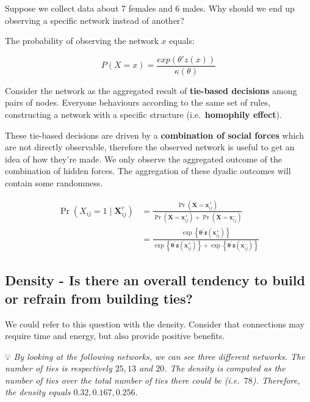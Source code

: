 \documentclass[
  notitlepage,
  onecolumn,
  openany]{book}
\begin{document}
Suppose we collect data about 7 females and 6 males. Why should we end up observing a specific network instead of another?

The probability of observing the network \(x\) equals:

\[
P(X=x) = \frac{exp(\theta'z(x))}{\kappa(\theta)}
\]

Consider the network as the aggregated result of \textbf{tie-based decisions} among pairs of nodes. Everyone behaviours according to the same set of rules, constructing a network with a specific structure (i.e.~\textbf{homophily effect}).

These tie-based decisions are driven by a \textbf{combination of social forces} which are not directly observable, therefore the observed network is useful to get an idea of how they're made. We only observe the aggregated outcome of the combination of hidden forces. The aggregation of these dyadic outcomes will contain some randomness.

\[
\begin{aligned}
\operatorname{Pr}\left(X_{i j}=1 \mid \mathbf{X}_{i j}^{c}\right) &=\frac{\operatorname{Pr}\left(\mathbf{X}=\mathbf{x}_{i j}^{+}\right)}{\operatorname{Pr}\left(\mathbf{X}=\mathbf{x}_{i j}^{+}\right)+\operatorname{Pr}\left(\mathbf{X}=\mathbf{x}_{i j}^{-}\right)} \\&=\frac{\exp \left\{\boldsymbol{\theta}^{\prime} \mathbf{z}\left(\mathbf{x}_{i j}^{+}\right)\right\}}{\exp \left\{\boldsymbol{\theta}^{\prime} \mathbf{z}\left(\mathbf{x}_{i j}^{+}\right)\right\}+\exp \left\{\boldsymbol{\theta}^{\prime} \mathbf{z}\left(\mathbf{x}_{i j}^{-}\right)\right\}}
\end{aligned}
\]

\hypertarget{density---is-there-an-overall-tendency-to-build-or-refrain-from-building-ties}{%
\subsection{Density - Is there an overall tendency to build or refrain from building ties?}\label{density---is-there-an-overall-tendency-to-build-or-refrain-from-building-ties}}

We could refer to this question with the density. Consider that connections may require time and energy, but also provide positive benefits.

💡 \emph{By looking at the following networks, we can see three different networks. The number of ties is respectively \(25, 13\) and \(20\). The density is computed as the number of ties over the total number of ties there could be (i.e.~\(78\)). Therefore, the density equals \(0.32, 0.167, 0.256\).}
\end{document}
